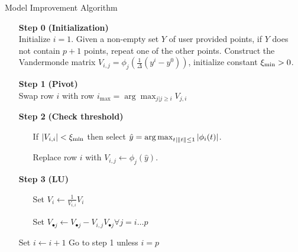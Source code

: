 \begin{algorithm}[H]
    \caption{Model Improvement Algorithm}
    \label{model_improving_algorithm}
    \begin{itemize}
        \item[\textbf{Step 0}] \textbf{(Initialization)} \\
            Initialize $i=1$.
            Given a non-empty set $Y$ of user provided points, if $Y$ does not contain $p+1$ points, repeat one of the other points. 
            Construct the Vandermonde matrix $V_{i,j} = \phi_j(\frac 1 {\Delta}(y^i - y^0))$, initialize constant $\xi_{\text{min}} > 0$.
        \item[\textbf{Step 1}] \textbf{(Pivot)} \\
            Swap row $i$ with row $i_{\max} = \arg \max_{j|j\ge i} V_{j,i} $
        
        \item[\textbf{Step 2}] \textbf{(Check threshold)} \begin{itemize}
                \item[] If $|V_{i,i}| < \xi_{\text{min}}$ then select \label{next_point} $ \hat y = \operatorname*{arg\,max}_{t | \|t\|\le 1} |\phi_i(t)|$.
                \item[] Replace row $i$ with $V_{i, j} \gets \phi_j(\hat y)$.
            \end{itemize}
        
        \item[\textbf{Step 3}] \textbf{(LU)} \begin{itemize}
                \item[] Set $V_i \gets \frac{1}{V_{i,i}} V_i$
                \item[] Set $V_{\bullet j} \gets V_{\bullet j} - V_{i,j} V_{\bullet j} \forall j=i \ldots p$
            \end{itemize}
            Set $i \gets i+1$
            Go to step 1 unless $i = p$
    \end{itemize}
\end{algorithm}
% 
% 
% 


